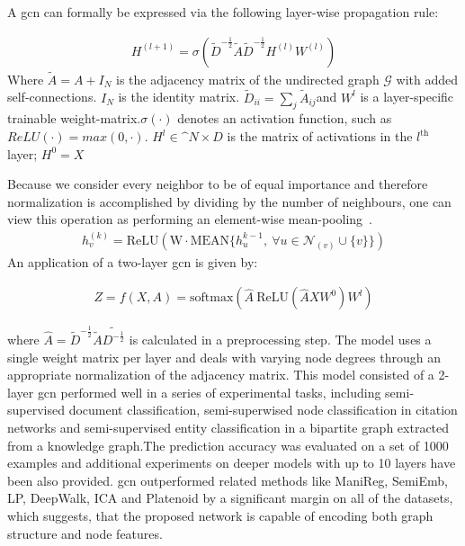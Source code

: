 A \acf{gcn} can formally be expressed via the following layer-wise propagation rule:

\begin{align*}
    H^{(l+1)} = \sigma (\tilde{D}^{-\frac{1}{2}}\tilde{A}\tilde{D}^{-\frac{1}{2}} H^{(l)}W^{(l)})
\end{align*}
Where $\tilde{A} = A + I_{N}$ is the adjacency matrix of the undirected graph $\mathcal{G}$
with added self-connections. $I_{N}$ is the identity matrix. $\tilde{D}_{ii} = \sum_{j}\tilde{A}_{ij}$and
$W^{l}$ is a layer-specific trainable weight-matrix.$\sigma(\cdot)$ denotes an activation function, such
as $ReLU(\cdot) = max(0, \cdot)$. $ H^{l}\in  \mathbb^{N \times D}$ is the matrix of activations in the
$l^{\mathrm{th}}$ layer; $H^{0}= X$

Because we consider every neighbor to be of equal importance and therefore normalization is accomplished
by dividing by the number of neighbours, one can view this operation as performing an element-wise
mean-pooling~\cite{Xu2019}.
\begin{align*}
    h_{v}^{(k)} = \mathrm{ReLU}(\mathrm{W} \cdot\mathrm{MEAN} \{h_{u}^{k-1},\ \forall{u} \in \mathcal{N}_{(v)} \cup \{v\}\})
\end{align*}
An application of a two-layer \ac{gcn} is given by:

\begin{align*}
    Z = f(X,A) = \mathrm{softmax} (\hat{A}\ \mathrm{ReLU}(\hat{A}XW^{0})W^{l})
\end{align*}

where $\hat{A} = \tilde{D}^{-\frac{1}{2}}\tilde{A}\tilde{D^{-\frac{1}{2}}}$
is calculated in a preprocessing step. The model uses a single weight matrix per layer and
deals with varying node degrees through an appropriate normalization of the adjacency matrix.
This model consisted of a 2-layer \ac{gcn} performed well in a series of experimental tasks,
including semi-supervised document classification, semi-superwised node classification in citation
networks and semi-supervised entity classification in a bipartite graph extracted from a knowledge
graph.The prediction accuracy was evaluated on a set of 1000 examples and additional experiments on
deeper models with up to 10 layers have been also provided. \ac{gcn} outperformed related methods
like ManiReg, SemiEmb, LP, DeepWalk, ICA and Platenoid by a significant margin on all of the datasets, which suggests, that the proposed
network is capable of encoding both graph structure and node features.

